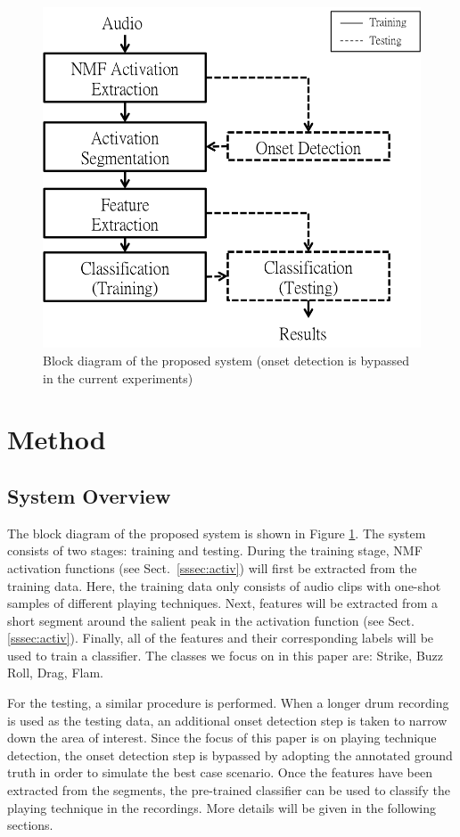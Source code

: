 \documentclass{article}
\begin{document}

\begin{figure}
\centering
\includegraphics[width = 7 cm]{./figures/block_diagram.png}
\caption{Block diagram of the proposed system (onset detection is bypassed in the current experiments)}
\label{fig:block}
\end{figure}

\section{Method}\label{sec:method}
\subsection{System Overview}\label{ssec:overview}

The block diagram of the proposed system is shown in Figure \ref{fig:block}. The system consists of two stages: training and testing. During the training stage, NMF activation functions (see Sect.~\ref{sssec:activ}) will first be extracted from the training data. Here, the training data only consists of audio clips with one-shot samples of different playing techniques. Next, features will be extracted from a short segment around the salient peak in the activation function (see Sect. \ref{sssec:activ}). Finally, all of the features and their corresponding labels will be used to train a classifier. The classes we focus on in this paper are: Strike, Buzz Roll, Drag, Flam. 

For the testing, a similar procedure is performed. When a longer drum recording is used as the testing data, an additional onset detection step is taken to narrow down the area of interest. %
Since the focus of this paper is on playing technique detection, the onset detection step is bypassed by adopting the annotated ground truth in order to simulate the best case scenario. Once the features have been extracted from the segments, the pre-trained classifier can be used to classify the playing technique in the recordings. More details will be given in the following sections. 
 
\end{document}
